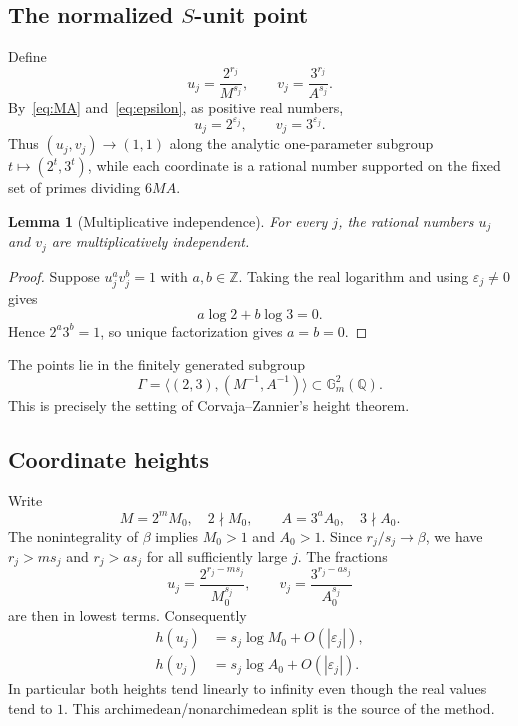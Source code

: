 \documentclass[11pt,oneside]{article}
\newtheorem{lemma}[theorem]{Lemma}
\theoremstyle{definition}
\theoremstyle{remark}
\newcommand{\Z}{\mathbb Z}
\newcommand{\Q}{\mathbb Q}
\newcommand{\Gm}{\mathbb G_m}
\newcommand{\eps}{\varepsilon}
\begin{document}
\subsection{The normalized \texorpdfstring{$S$}{S}-unit point}

Define
\begin{equation}
 u_j=\frac{2^{r_j}}{M^{s_j}},\qquad
 v_j=\frac{3^{r_j}}{A^{s_j}}.
 \label{eq:uv}
\end{equation}
By~\eqref{eq:MA} and~\eqref{eq:epsilon}, as positive real numbers,
\begin{equation}
 u_j=2^{\eps_j},\qquad v_j=3^{\eps_j}.
 \label{eq:real-path}
\end{equation}
Thus $(u_j,v_j)\to(1,1)$ along the analytic one-parameter subgroup
$t\mapsto(2^t,3^t)$, while each coordinate is a rational number supported on the fixed set of
primes dividing $6MA$.

\begin{lemma}[Multiplicative independence]
\label{lem:uv-independent}
For every $j$, the rational numbers $u_j$ and $v_j$ are multiplicatively independent.
\end{lemma}

\begin{proof}
Suppose $u_j^a v_j^b=1$ with $a,b\in\Z$.  Taking the real logarithm and using
$\eps_j\ne0$ gives
\[
 a\log2+b\log3=0.
\]
Hence $2^a3^b=1$, so unique factorization gives $a=b=0$.
\end{proof}

The points lie in the finitely generated subgroup
\begin{equation}
 \Gamma=\langle(2,3),(M^{-1},A^{-1})\rangle\subset\Gm^2(\Q).
 \label{eq:Gamma}
\end{equation}
This is precisely the setting of Corvaja--Zannier's height theorem.

\subsection{Coordinate heights}

Write
\begin{equation}
 M=2^mM_0,\quad 2\nmid M_0,
 \qquad
 A=3^aA_0,\quad 3\nmid A_0.
 \label{eq:basefree}
\end{equation}
The nonintegrality of $\beta$ implies $M_0>1$ and $A_0>1$.  Since $r_j/s_j\to\beta$,
we have $r_j>ms_j$ and $r_j>as_j$ for all sufficiently large $j$.  The fractions
\[
 u_j=\frac{2^{r_j-ms_j}}{M_0^{s_j}},\qquad
 v_j=\frac{3^{r_j-as_j}}{A_0^{s_j}}
\]
are then in lowest terms.  Consequently
\begin{align}
 h(u_j)&=s_j\log M_0+O(|\eps_j|),
 \label{eq:hu}\\
 h(v_j)&=s_j\log A_0+O(|\eps_j|).
 \label{eq:hv}
\end{align}
In particular both heights tend linearly to infinity even though the real values tend to $1$.
This archimedean/nonarchimedean split is the source of the method.
\end{document}
